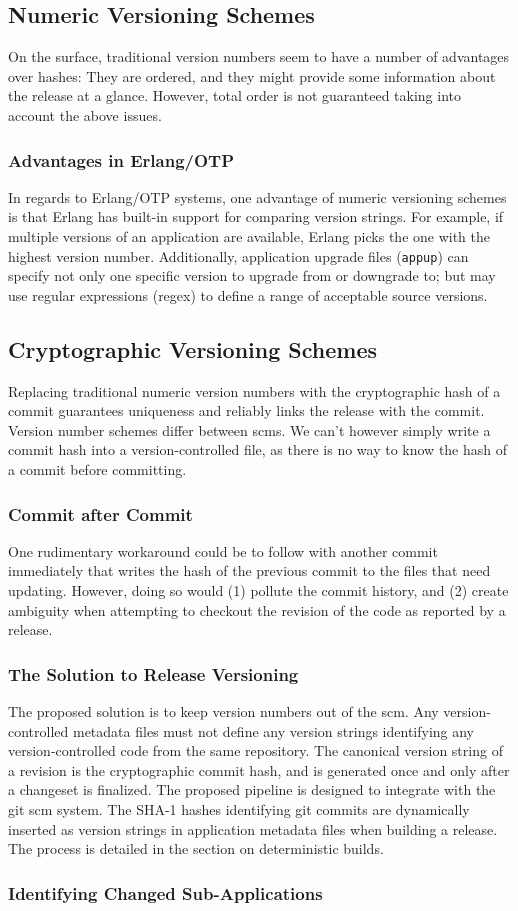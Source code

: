 \subsection{Numeric Versioning Schemes}
On the surface, traditional version numbers seem to have a number of advantages over hashes: They are ordered, and they might provide some information about the release at a glance. However, total order is not guaranteed taking into account the above issues.

\subsubsection{Advantages in Erlang/OTP}
In regards to Erlang/OTP systems, one advantage of numeric versioning schemes is that Erlang has built-in support for comparing version strings. For example, if multiple versions of an application are available, Erlang picks the one with the highest version number. Additionally, application upgrade files (\lstinline|appup|) can specify not only one specific version to upgrade from or downgrade to; but may use regular expressions (regex) to define a range of acceptable source versions.\cite{cesarini:otp}

\subsection{Cryptographic Versioning Schemes}
Replacing traditional numeric version numbers with the cryptographic hash of a commit guarantees uniqueness and reliably links the release with the commit. Version number schemes differ between \acrfull{scm}s. We can't however simply write a commit hash into a version-controlled file, as there is no way to know the hash of a commit before committing.

\subsubsection{Commit after Commit}
One rudimentary workaround could be to follow with another commit immediately that writes the hash of the previous commit to the files that need updating. However, doing so would (1) pollute the commit history, and (2) create ambiguity when attempting to checkout the revision of the code as reported by a release.

\subsubsection{The Solution to Release Versioning}
The proposed solution is to keep version numbers out of the \acrshort{scm}. Any version-controlled metadata files must not define any version strings identifying any version-controlled code from the same repository. The canonical version string of a revision is the cryptographic commit hash, and is generated once and only after a changeset is finalized. The proposed pipeline is designed to integrate with the git \acrshort{scm} system. The SHA-1 hashes identifying git commits are dynamically inserted as version strings in application metadata files when building a release. The process is detailed in the section on deterministic builds.

\subsubsection{Identifying Changed Sub-Applications}

